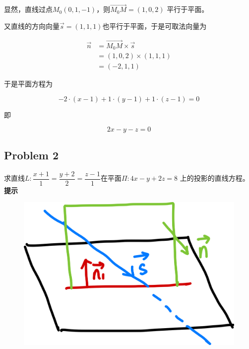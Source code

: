 \documentclass[12pt, a4paper]{article}
\numberwithin{equation}{section}
\begin{document}
    显然，直线过点\(M_{0}\left(0,1,-1\right)\)，则\(\overrightarrow{M_{0}M} = \left(1,0,2\right)\)
    平行于平面。

    又直线的方向向量\(\overrightarrow{s} = \left(1,1,1\right)\)也平行于平面，于是可取法向量为

    \begin{align*}
        \overrightarrow{n} &= \overrightarrow{M_{0}M} \times \overrightarrow{s} \\
        &= \left(1,0,2\right) \times \left(1,1,1\right) \\
        &= \left(-2,1,1\right)
    \end{align*}

    于是平面方程为

    \[
        -2 \cdot \left(x-1\right) + 1 \cdot \left(y-1\right) + 1 \cdot \left(z-1\right) = 0
    \]

    即

    \[
        2x-y-z=0
    \]

\subsection{Problem 2}

    求直线$L: \dfrac{x+1}{1}=\dfrac{y+2}{2}=\dfrac{z-1}{1}$在平面\(\Pi: 4x-y + 2z = 8\)
    上的投影的直线方程。
    \\

    \textbf{提示}
    \\

    \begin{figure}
        \centering
        \includegraphics[scale=0.06]{"Chapter 08 images/pic20.png"}
        \label{pic20}
    \end{figure}
\end{document}
